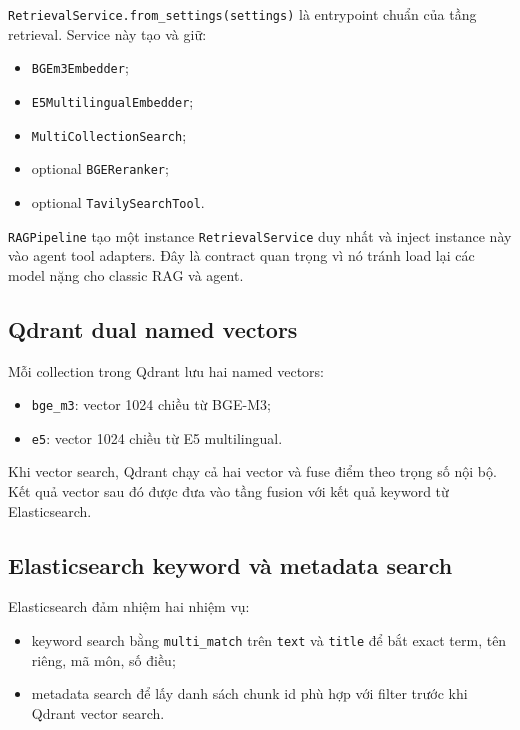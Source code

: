 \documentclass[../DoAn.tex]{subfiles}
\begin{document}
\texttt{RetrievalService.from\_settings(settings)} là entrypoint chuẩn của tầng
retrieval. Service này tạo và giữ:

\begin{itemize}
    \item \texttt{BGEm3Embedder};
    \item \texttt{E5MultilingualEmbedder};
    \item \texttt{MultiCollectionSearch};
    \item optional \texttt{BGEReranker};
    \item optional \texttt{TavilySearchTool}.
\end{itemize}

\texttt{RAGPipeline} tạo một instance \texttt{RetrievalService} duy nhất và inject
instance này vào agent tool adapters. Đây là contract quan trọng vì nó tránh load
lại các model nặng cho classic RAG và agent.

\subsection{Qdrant dual named vectors}

Mỗi collection trong Qdrant lưu hai named vectors:

\begin{itemize}
    \item \texttt{bge\_m3}: vector 1024 chiều từ BGE-M3;
    \item \texttt{e5}: vector 1024 chiều từ E5 multilingual.
\end{itemize}

Khi vector search, Qdrant chạy cả hai vector và fuse điểm theo trọng số nội bộ.
Kết quả vector sau đó được đưa vào tầng fusion với kết quả keyword từ
Elasticsearch.

\subsection{Elasticsearch keyword và metadata search}

Elasticsearch đảm nhiệm hai nhiệm vụ:

\begin{itemize}
    \item keyword search bằng \texttt{multi\_match} trên \texttt{text} và
    \texttt{title} để bắt exact term, tên riêng, mã môn, số điều;
    \item metadata search để lấy danh sách chunk id phù hợp với filter trước khi
    Qdrant vector search.
\end{itemize}
\end{document}
